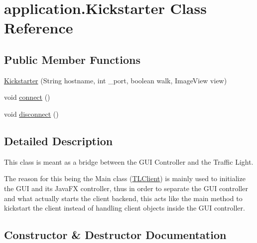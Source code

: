 \hypertarget{classapplication_1_1_kickstarter}{}\section{application.\+Kickstarter Class Reference}
\label{classapplication_1_1_kickstarter}
\subsection*{Public Member Functions}
\begin{DoxyCompactItemize}
\item 
\hyperlink{classapplication_1_1_kickstarter_a967b3fbe01bc93fef2821741613d0db7}{Kickstarter} (String hostname, int \+\_\+port, boolean walk, Image\+View view)
\item 
void \hyperlink{classapplication_1_1_kickstarter_a13fc6c3b4b32c29af30649cf387a5bc0}{connect} ()
\item 
void \hyperlink{classapplication_1_1_kickstarter_ab4c9b1c4909606883afeff6552d2bd8b}{disconnect} ()
\end{DoxyCompactItemize}


\subsection{Detailed Description}
This class is meant as a bridge between the G\+UI Controller and the Traffic Light.

The reason for this being the Main class (\hyperlink{classapplication_1_1_t_l_client}{T\+L\+Client}) is mainly used to initialize the G\+UI and its Java\+FX controller, thus in order to separate the G\+UI controller and what actually starts the client backend, this acts like the main method to kickstart the client instead of handling client objects inside the G\+UI controller. 

\subsection{Constructor \& Destructor Documentation}
